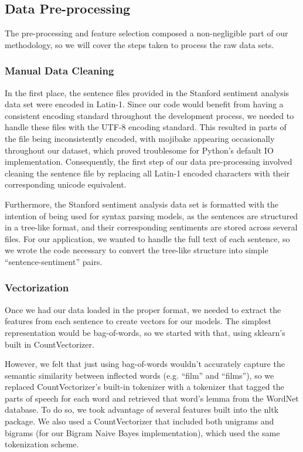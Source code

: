 \documentclass[conference]{IEEEtran}
\begin{document}
\subsection{Data Pre-processing}

The pre-processing and feature selection composed a non-negligible part of our methodology, so we will cover the steps taken to process the raw data sets. 

\subsubsection{Manual Data Cleaning}

In the first place, the sentence files provided in the Stanford sentiment analysis data set were encoded in Latin-1. Since our code would benefit from having a consistent encoding standard throughout the development process, we needed to handle these files with the UTF-8 encoding standard. This resulted in parts of the file being inconsistently encoded, with mojibake appearing occasionally throughout our dataset, which proved troublesome for Python's default IO implementation. Consequently, the first step of our data pre-processing involved cleaning the sentence file by replacing all Latin-1 encoded characters with their corresponding unicode equivalent.

Furthermore, the Stanford sentiment analysis data set is formatted with the intention of being used for syntax parsing models, as the sentences are structured in a tree-like format, and their corresponding sentiments are stored across several files. For our application, we wanted to handle the full text of each sentence, so we wrote the code necessary to convert the tree-like structure into simple ``sentence-sentiment'' pairs.

\subsubsection{Vectorization}

Once we had our data loaded in the proper format, we needed to extract the features from each sentence to create vectors for our models. The simplest representation would be bag-of-words, so we started with that, using sklearn's built in CountVectorizer.

However, we felt that just using bag-of-words wouldn't accurately capture the semantic similarity between inflected words (e.g. ``film'' and ``films''), so we replaced CountVectorizer's built-in tokenizer with a tokenizer that tagged the parts of speech for each word and retrieved that word's lemma from the WordNet database. To do so, we took advantage of several features built into the nltk package. We also used a CountVectorizer that included both unigrams and bigrams (for our Bigram Naive Bayes implementation), which used the same tokenization scheme.
\end{document}
